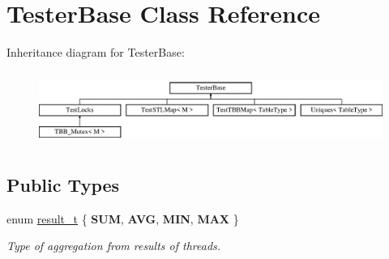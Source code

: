 \hypertarget{classTesterBase}{}\section{Tester\+Base Class Reference}
\label{classTesterBase}
Inheritance diagram for Tester\+Base\+:\begin{figure}[H]
\begin{center}
\leavevmode
\includegraphics[height=2.413793cm]{classTesterBase}
\end{center}
\end{figure}
\subsection*{Public Types}
\begin{DoxyCompactItemize}
\item 
\hypertarget{classTesterBase_aa4b9a75a4516a4f3ab9485b437693811}{}enum \hyperlink{classTesterBase_aa4b9a75a4516a4f3ab9485b437693811}{result\+\_\+t} \{ {\bfseries S\+U\+M}, 
{\bfseries A\+V\+G}, 
{\bfseries M\+I\+N}, 
{\bfseries M\+A\+X}
 \}\label{classTesterBase_aa4b9a75a4516a4f3ab9485b437693811}
\begin{DoxyCompactList}\small\item\em Type of aggregation from results of threads. \end{DoxyCompactList}
\end{DoxyCompactItemize}
